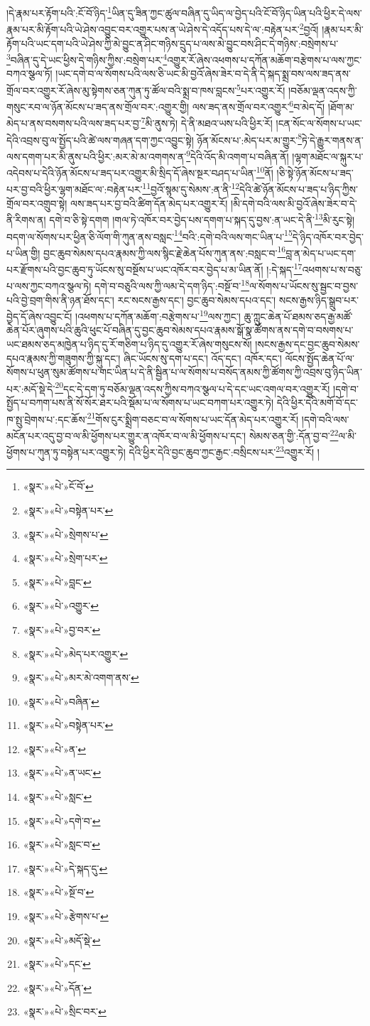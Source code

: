 །དེ་རྣམ་པར་རྟོག་པའི་:ངོ་བོ་ཉིད་\footnote{«སྣར་»«པེ་»ངོ་བོ་}ཡིན་དུ་ཟིན་ཀྱང་ཚུལ་བཞིན་དུ་ཡིད་ལ་བྱེད་པའི་ངོ་བོ་ཉིད་ཡིན་པའི་ཕྱིར་དེ་ལས་རྣམ་པར་མི་རྟོག་པའི་ཡེ་ཤེས་འབྱུང་བར་འགྱུར་པས་ན་ཡེ་ཤེས་དེ་འདོད་པས་དེ་ལ་:བརྟེན་པར་\footnote{«སྣར་»«པེ་»བསྟེན་པར་}བྱའོ། །རྣམ་པར་མི་རྟོག་པའི་ཡང་དག་པའི་ཡེ་ཤེས་ཀྱི་མེ་བྱུང་ན་ཤིང་གཉིས་དྲུད་པ་ལས་མེ་བྱུང་བས་ཤིང་དེ་གཉིས་:བསྲེགས་པ་\footnote{«སྣར་»«པེ་»སྲེགས་པ་}བཞིན་དུ་དེ་ཡང་ཕྱིས་དེ་གཉིས་ཀྱིས་:བསྲེག་པར་\footnote{«སྣར་»«པེ་»སྲེག་པར་}འགྱུར་རོ་ཞེས་འཕགས་པ་དཀོན་མཆོག་བརྩེགས་པ་ལས་ཀྱང་བཀའ་སྩལ་ཏོ། །ཡང་དགེ་བ་ལ་སོགས་པའི་ལས་ཅི་ཡང་མི་བྱའོ་ཞེས་ཟེར་བ་དེ་ནི་དེ་སྐད་སྨྲ་བས་ལས་ཟད་ནས་གྲོལ་བར་འགྱུར་རོ་ཞེས་མུ་སྟེགས་ཅན་ཀུན་ཏུ་ཚོལ་བའི་སྨྲ་བ་ཁས་བླངས་\footnote{«སྣར་»«པེ་»བླང་}པར་འགྱུར་རོ། །བཅོམ་ལྡན་འདས་ཀྱི་གསུང་རབ་ལ་ཉོན་མོངས་པ་ཟད་ནས་གྲོལ་བར་:འགྱུར་གྱི། ལས་ཟད་ནས་གྲོལ་བར་འགྱུར་\footnote{«སྣར་»«པེ་»འགྱུར་}བ་མེད་དོ། །ཐོག་མ་མེད་པ་ནས་བསགས་པའི་ལས་ཟད་པར་བྱ་\footnote{«སྣར་»«པེ་»བྱ་བར་}མི་ནུས་ཏེ། དེ་ནི་མཐའ་ཡས་པའི་ཕྱིར་རོ། །ངན་སོང་ལ་སོགས་པ་ཡང་དེའི་འབྲས་བུ་ལ་སྤྱོད་པའི་ཚེ་ལས་གཞན་དག་ཀྱང་འབྱུང་སྟེ། ཉོན་མོངས་པ་:མེད་པར་མ་གྱུར་\footnote{«སྣར་»«པེ་»མེད་པར་འགྱུར་}ཏེ་དེ་རྒྱུར་གནས་ན་ལས་དགག་པར་མི་ནུས་པའི་ཕྱིར་:མར་མེ་མ་འགགས་ན་\footnote{«སྣར་»«པེ་»མར་མེ་འགག་ནས་}དེའི་འོད་མི་འགག་པ་བཞིན་ནོ། །ལྷག་མཐོང་ལ་སྐུར་པ་འདེབས་པ་དེའི་ཉོན་མོངས་པ་ཟད་པར་འགྱུར་མི་སྲིད་དོ་ཞེས་སྔར་བཤད་པ་ཡིན་\footnote{«སྣར་»«པེ་»བཞིན་}ནོ། །ཅི་སྟེ་ཉོན་མོངས་པ་ཟད་པར་བྱ་བའི་ཕྱིར་ལྷག་མཐོང་ལ་:བརྟེན་པར་\footnote{«སྣར་»«པེ་»བསྟེན་པར་}བྱའོ་སྙམ་དུ་སེམས་:ན་ནི་\footnote{«སྣར་»«པེ་»ན་}དེའི་ཚེ་ཉོན་མོངས་པ་ཟད་པ་ཉིད་ཀྱིས་གྲོལ་བར་འགྲུབ་སྟེ། ལས་ཟད་པར་བྱ་བའི་ཚིག་དོན་མེད་པར་འགྱུར་རོ། །མི་དགེ་བའི་ལས་མི་བྱའོ་ཞེས་ཟེར་བ་དེ་ནི་རིགས་ན། དགེ་བ་ཅི་སྟེ་དགག །གལ་ཏེ་འཁོར་བར་བྱེད་པས་དགག་པ་སྐད་དུ་བྱས་:ན་ཡང་དེ་ནི་\footnote{«སྣར་»«པེ་»ན་ཡང་}མི་རུང་སྟེ། བདག་ལ་སོགས་པར་ཕྱིན་ཅི་ལོག་གི་ཀུན་ནས་བསླང་\footnote{«སྣར་»«པེ་»སླང་}བའི་:དགེ་བའི་ལས་གང་ཡིན་པ་\footnote{«སྣར་»«པེ་»དགེ་བ་}དེ་ཉིད་འཁོར་བར་བྱེད་པ་ཡིན་གྱི། བྱང་ཆུབ་སེམས་དཔའ་རྣམས་ཀྱི་ལས་སྙིང་རྗེ་ཆེན་པོས་ཀུན་ནས་:བསླང་བ་\footnote{«སྣར་»«པེ་»སླང་བ་}བླ་ན་མེད་པ་ཡང་དག་པར་རྫོགས་པའི་བྱང་ཆུབ་ཏུ་ཡོངས་སུ་བསྔོས་པ་ཡང་འཁོར་བར་བྱེད་པ་མ་ཡིན་ནོ། །:དེ་སྐད་\footnote{«སྣར་»«པེ་»དེ་སྐད་དུ་}འཕགས་པ་ས་བཅུ་པ་ལས་ཀྱང་བཀའ་སྩལ་ཏེ། དགེ་བ་བཅུའི་ལས་ཀྱི་ལམ་དེ་དག་ཉིད་:བསྔོ་བ་\footnote{«སྣར་»«པེ་»སྔོ་བ་}ལ་སོགས་པ་ཡོངས་སུ་སྦྱང་བ་བྱས་པའི་བྱེ་བྲག་གིས་ནི་ཉན་ཐོས་དང་། རང་སངས་རྒྱས་དང་། བྱང་ཆུབ་སེམས་དཔའ་དང་། སངས་རྒྱས་ཉིད་སྒྲུབ་པར་བྱེད་དོ་ཞེས་འབྱུང་ངོ། །འཕགས་པ་དཀོན་མཆོག་:བརྩེགས་པ་\footnote{«སྣར་»«པེ་»རྩེགས་པ་}ལས་ཀྱང་། ཆུ་ཀླུང་ཆེན་པོ་ཐམས་ཅད་རྒྱ་མཚོ་ཆེན་པོར་ཞུགས་པའི་ཆུའི་ཕུང་པོ་བཞིན་དུ་བྱང་ཆུབ་སེམས་དཔའ་རྣམས་སྒོ་སྣ་ཚོགས་ནས་དགེ་བ་བསགས་པ་ཡང་ཐམས་ཅད་མཁྱེན་པ་ཉིད་དུ་རོ་གཅིག་པ་ཉིད་དུ་འགྱུར་རོ་ཞེས་གསུངས་སོ། །སངས་རྒྱས་དང་བྱང་ཆུབ་སེམས་དཔའ་རྣམས་ཀྱི་གཟུགས་ཀྱི་སྐུ་དང་། ཞིང་ཡོངས་སུ་དག་པ་དང་། འོད་དང་། འཁོར་དང་། ལོངས་སྤྱོད་ཆེན་པོ་ལ་སོགས་པ་ཕུན་སུམ་ཚོགས་པ་གང་ཡིན་པ་དེ་ནི་སྦྱིན་པ་ལ་སོགས་པ་བསོད་ནམས་ཀྱི་ཚོགས་ཀྱི་འབྲས་བུ་ཉིད་ཡིན་པར་:མདོ་སྡེ་དེ་\footnote{«སྣར་»«པེ་»མདོ་སྡེ་}དང་དེ་དག་ཏུ་བཅོམ་ལྡན་འདས་ཀྱིས་བཀའ་སྩལ་པ་དེ་དང་ཡང་འགལ་བར་འགྱུར་རོ། །དགེ་བ་སྤྱོད་པ་བཀག་པས་ནི་སོ་སོར་ཐར་པའི་སྡོམ་པ་ལ་སོགས་པ་ཡང་བཀག་པར་འགྱུར་ཏེ། དེའི་ཕྱིར་དེའི་མགོ་བོ་དང་ཁ་སྤུ་བྲེགས་པ་:དང་ཆོས་\footnote{«སྣར་»«པེ་»དང་}གོས་ངུར་སྨྲིག་བཅང་བ་ལ་སོགས་པ་ཡང་དོན་མེད་པར་འགྱུར་རོ། །དགེ་བའི་ལས་མངོན་པར་འདུ་བྱ་བ་ལ་མི་ཕྱོགས་པར་གྱུར་ན་འཁོར་བ་ལ་མི་ཕྱོགས་པ་དང་། སེམས་ཅན་གྱི་:དོན་བྱ་བ་\footnote{«སྣར་»«པེ་»དོན་}ལ་མི་ཕྱོགས་པ་ཀུན་ཏུ་བསྟེན་པར་འགྱུར་ཏེ། དེའི་ཕྱིར་དེའི་བྱང་ཆུབ་ཀྱང་རྒྱང་:བསྲིངས་པར་\footnote{«སྣར་»«པེ་»སྲིང་བར་}འགྱུར་རོ། །
